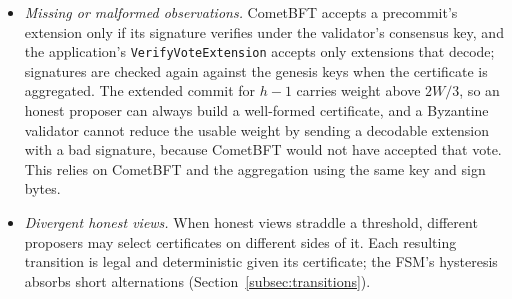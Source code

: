 \begin{itemize}
  If
  omission drops $S$ to weight at most $2W/3$, the certificate is not
  well-formed and honest validators reject the proposal. The only exception
  is the first height after vote extensions are enabled, whose predecessor
  carries no extensions; there the certificate is replaced by a maximally
  degraded metric vector, the conservative choice. In the live collusion suite (Section~\ref{sec:evaluation}, case B3), honest validators accepted a proposer that kept exactly a quorum of certificates in 3 of 3 repeats and rejected one that kept fewer, 210 times in total across 3 repeats.
  \item \emph{Missing or malformed observations.} CometBFT accepts a
  precommit's extension only if its signature verifies under the validator's
  consensus key, and the application's \texttt{VerifyVoteExtension} accepts
  only extensions that decode; signatures are checked again against the
  genesis keys when the certificate is aggregated. The extended commit for
  $h{-}1$ carries weight above $2W/3$, so an honest proposer can always build
  a well-formed certificate, and a Byzantine validator cannot reduce the
  usable weight by sending a decodable extension with a bad signature,
  because CometBFT would not have accepted that vote. This relies on CometBFT
  and the aggregation using the same key and sign bytes.
  \item \emph{Divergent honest views.} When honest views straddle a
  threshold, different proposers may select certificates on different sides
  of it. Each resulting transition is legal and deterministic given its
  certificate; the FSM's hysteresis absorbs short alternations
  (Section~\ref{subsec:transitions}).
\end{itemize}
